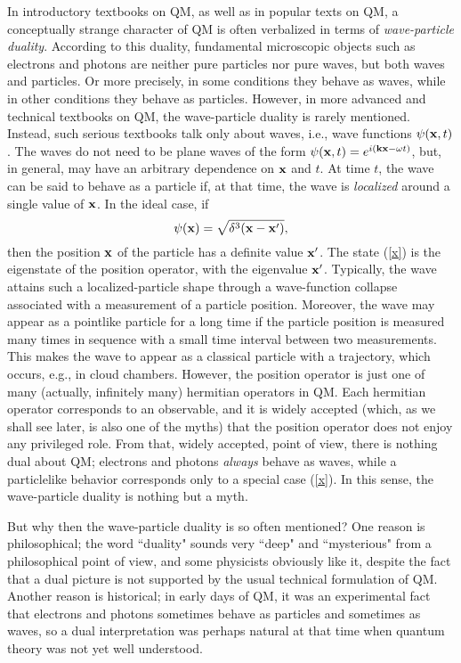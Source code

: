 \documentclass[12pt]{article}
\begin{document}
In introductory textbooks on QM, as well as in popular texts on 
QM, a conceptually strange character of QM is often verbalized 
in terms of {\it wave-particle duality}. According to this duality, 
fundamental microscopic objects such as electrons and photons 
are neither pure particles nor pure waves, but both waves and particles.
Or more precisely, in some conditions they behave as waves, 
while in other conditions they behave as particles.
However, in more advanced and technical textbooks on QM, 
the wave-particle duality is rarely mentioned. Instead, 
such serious textbooks talk only about waves, i.e., wave functions 
$\psi({\bf x},t)$. The waves do not need to be plane waves 
of the form $\psi({\bf x},t)=e^{i({\bf kx}-\omega t)}$, but, 
in general, may have an arbitrary dependence on ${\bf x}$ and 
$t$. At time $t$, the wave can be said to behave as a particle
if, at that time, the wave is {\em localized} 
around a single value of ${\bf x}$.
In the ideal case, if 
\begin{equation}\label{x}
\psi({\bf x})=\sqrt{\delta^3({\bf x}-{\bf x}')} ,
\end{equation}
then the position ${\bf x}$ of the particle has a definite 
value ${\bf x}'$.
The state (\ref{x}) is the eigenstate of the position operator, 
with the eigenvalue ${\bf x}'$. 
%
Typically, the wave attains such a localized-particle shape through
a wave-function collapse associated with a measurement of a 
particle position. Moreover, the wave may appear as a pointlike
particle for a long time if the particle position is measured
many times in sequence with a small time interval between two 
measurements. This makes the wave to appear as a classical particle 
with a trajectory, which occurs, e.g., in cloud chambers.  
%
However, the position operator 
is just one of many (actually, infinitely many) hermitian operators
in QM. Each hermitian operator corresponds to an observable, and
it is widely accepted (which, as we shall see later, is also one of 
the myths) that the position operator does not enjoy any privileged 
role. From that, widely accepted, point of view, there is nothing 
dual about QM; electrons and photons {\em always} behave as 
waves, while a particlelike behavior corresponds only to a 
special case (\ref{x}). In this sense, the wave-particle duality is 
nothing but a myth.

But why then the wave-particle duality is so often mentioned?
One reason is philosophical; the word ``duality" sounds 
very ``deep" and ``mysterious" from a philosophical point of view, 
and some physicists obviously like it, despite the fact 
that a dual picture is not supported by the usual technical 
formulation of QM.  
Another reason is historical; in early days of QM, 
it was an experimental fact that electrons and photons 
sometimes behave as particles and sometimes as waves,
so a dual interpretation was perhaps natural at that time
when quantum theory was not yet well understood.    
\end{document}
